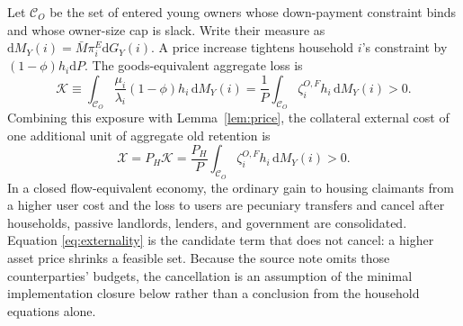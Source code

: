 \documentclass[11pt]{article}
\newcommand{\dd}{\mathrm d}
\newcommand{\1}{\mathbf 1}
\begin{document}
Let $\mathcal C_O$ be the set of entered young owners whose down-payment
constraint binds and whose owner-size cap is slack. Write their measure as
$\dd M_Y(i)=\bar M\pi_i^E\dd G_Y(i)$. A price increase tightens household
$i$'s constraint by $(1-\phi)h_i\dd P$. The goods-equivalent aggregate loss is
\begin{equation}
\mathcal K
\equiv
\int_{\mathcal C_O}
\frac{\mu_i}{\lambda_i}(1-\phi)h_i\,\dd M_Y(i)
=\frac1P\int_{\mathcal C_O}\zeta_i^{O,F}h_i\,\dd M_Y(i)>0.
\label{eq:Kcollateral}
\end{equation}
Combining this exposure with Lemma~\ref{lem:price}, the collateral external
cost of one additional unit of aggregate old retention is
\begin{equation}
\boxed{
\mathcal X=P_H\mathcal K
=\frac{P_H}{P}\int_{\mathcal C_O}
\zeta_i^{O,F}h_i\,\dd M_Y(i)>0.}
\label{eq:externality}
\end{equation}
In a closed flow-equivalent economy, the ordinary gain to housing claimants
from a higher user cost and the loss to users are pecuniary transfers and
cancel after households, passive landlords, lenders, and government are
consolidated. Equation \eqref{eq:externality} is the candidate term that does
not cancel: a higher asset price shrinks a feasible set. Because the source
note omits those counterparties' budgets, the cancellation is an assumption
of the minimal implementation closure below rather than a conclusion from the
household equations alone.
\end{document}
